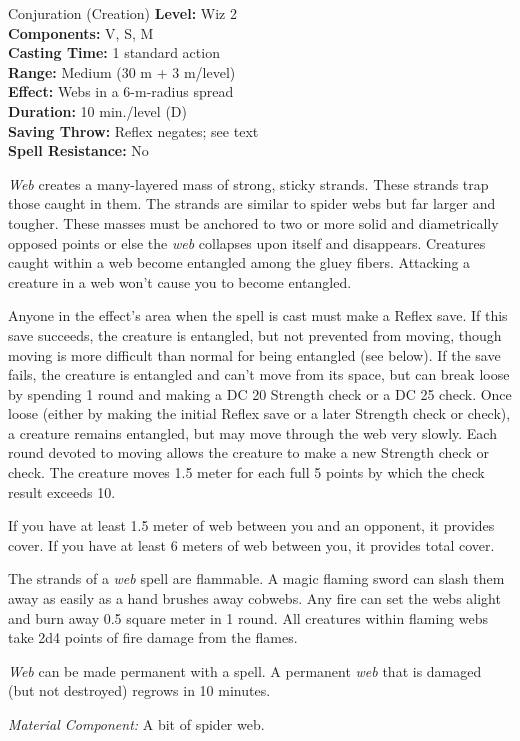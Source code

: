 {Conjuration (Creation)}
{
	\textbf{Level:}
	Wiz 2\\
	\textbf{Components:}
	V, S, M\\
	\textbf{Casting Time:}
	1 standard action\\
	\textbf{Range:}
	Medium (30 m + 3 m/level)\\
	\textbf{Effect:}
	Webs in a 6-m-radius spread\\
	\textbf{Duration:}
	10 min./level (D)\\
	\textbf{Saving Throw:}
	Reflex negates; see text\\
	\textbf{Spell Resistance:}
	No\\
}
{
	\emph{Web} creates a many-layered mass of strong, sticky strands. These strands trap those caught in them. The strands are similar to spider webs but far larger and tougher. These masses must be anchored to two or more solid and diametrically opposed points or else the \emph{web} collapses upon itself and disappears. Creatures caught within a web become entangled among the gluey fibers. Attacking a creature in a web won't cause you to become entangled.

	Anyone in the effect's area when the spell is cast must make a Reflex save. If this save succeeds, the creature is entangled, but not prevented from moving, though moving is more difficult than normal for being entangled (see below). If the save fails, the creature is entangled and can't move from its space, but can break loose by spending 1 round and making a DC 20 Strength check or a DC 25  check. Once loose (either by making the initial Reflex save or a later Strength check or  check), a creature remains entangled, but may move through the web very slowly. Each round devoted to moving allows the creature to make a new Strength check or  check. The creature moves 1.5 meter for each full 5 points by which the check result exceeds 10.

	If you have at least 1.5 meter of web between you and an opponent, it provides cover. If you have at least 6 meters of web between you, it provides total cover.

	The strands of a \emph{web} spell are flammable. A magic flaming sword can slash them away as easily as a hand brushes away cobwebs. Any fire can set the webs alight and burn away 0.5 square meter in 1 round. All creatures within flaming webs take 2d4 points of fire damage from the flames.

	\emph{Web} can be made permanent with a  spell. A permanent \emph{web} that is damaged (but not destroyed) regrows in 10 minutes.

	\textit{Material Component:}
	A bit of spider web.

}
